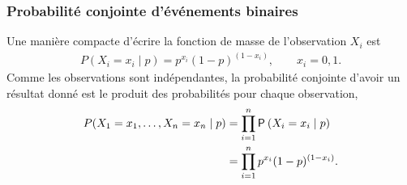 \documentclass{beamer}
\begin{document}
\begin{frame}[fragile]
\frametitle{Probabilité conjointe d'événements binaires}
 Une manière compacte d'écrire la fonction de masse de l'observation $X_i$ est
\begin{align*}
P(X_i=x_i \mid p)=p^{x_i} (1-p)^{(1-x_i)}, \qquad x_i=0, 1.
\end{align*}
 Comme les observations sont indépendantes, la probabilité conjointe d'avoir
un résultat donné est le produit des probabilités pour chaque observation,
\begin{align*}
P(X_1=x_1, \ldots, X_n=x_n\mid p)&=\prod_{i=1}^n \P{X_i=x_i  \mid p}\\&=\prod_{i=1}^n p^{x_i} (1-p)^{(1-x_i)}.
\end{align*}
\end{frame}
\end{document}
